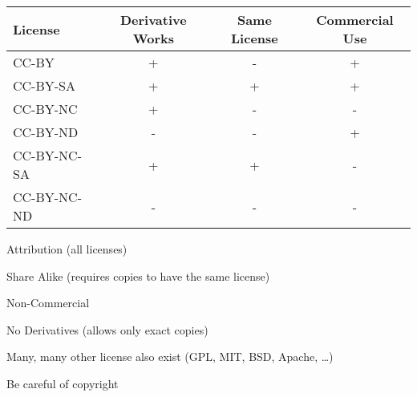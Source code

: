 \documentclass[a4paper,landscape,headrule,footrule,dvips]{foils}
\begin{document}
\begin{CJK}{UTF8}{min}
\medskip
\begin{tabular}{lccc}
  License       & Derivative Works & Same License & Commercial Use \\
\hline
  CC-BY         &   + &  - &  + \\
  CC-BY-SA      &   + &  + &  + \\  
  CC-BY-NC      &   + &  - &  - \\
  CC-BY-ND      &   - &  - &  + \\
  CC-BY-NC-SA   &   + &  + &  - \\
  CC-BY-NC-ND   &   - &  - &  - \\
\end{tabular}
\begin{description} \addtolength{\itemsep}{-0.5\itemsep}
\item[BY] Attribution (all licenses)
\item[SA] Share Alike (requires copies to have the same license)
\item[NC] Non-Commercial 
\item[ND] No Derivatives (allows only exact copies) 
\end{description}

Many, many other license also exist (GPL, MIT, BSD, Apache, \ldots)


\begin{center}
  Be careful of copyright
\end{center}




\end{CJK}
\end{document}
